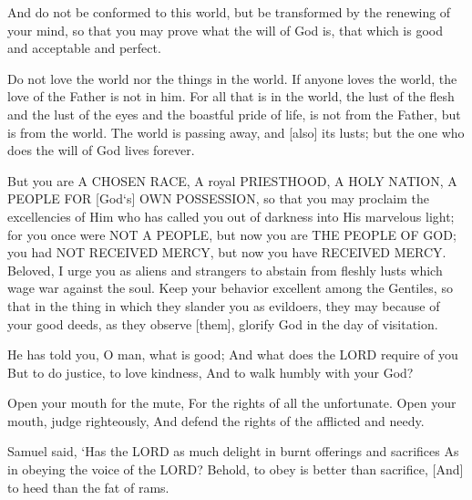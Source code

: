 \begin{scripture}[Romans 12:2]
    And do not be conformed to this world, but be transformed by the renewing of your mind, so that you may prove what the will of God is, that which is good and acceptable and perfect.
\end{scripture}

\begin{scripture}[1 John 2:15-17]
    Do not love the world nor the things in the world. If anyone loves the world, the love of the Father is not in him.
    For all that is in the world, the lust of the flesh and the lust of the eyes and the boastful pride of life, is not from the Father, but is from the world.
    The world is passing away, and [also] its lusts; but the one who does the will of God lives forever.
\end{scripture}

\begin{scripture}[1 Peter 2:9-12]
    But you are A CHOSEN RACE, A royal PRIESTHOOD, A HOLY NATION, A PEOPLE FOR [God`s] OWN POSSESSION, so that you may proclaim the excellencies of Him who has called you out of darkness into His marvelous light;
    for you once were NOT A PEOPLE, but now you are THE PEOPLE OF GOD; you had NOT RECEIVED MERCY, but now you have RECEIVED MERCY.
    Beloved, I urge you as aliens and strangers to abstain from fleshly lusts which wage war against the soul.
    Keep your behavior excellent among the Gentiles, so that in the thing in which they slander you as evildoers, they may because of your good deeds, as they observe [them], glorify God in the day of visitation.
\end{scripture}

\begin{scripture}[Micah 6:8]
    He has told you, O man, what is good; And what does the LORD require of you But to do justice, to love kindness, And to walk humbly with your God?
\end{scripture}

\begin{scripture}[Proverbs 31:8-9]
    Open your mouth for the mute, For the rights of all the unfortunate.
    Open your mouth, judge righteously, And defend the rights of the afflicted and needy.
\end{scripture}

\begin{scripture}[1 Samuel 15:22]
    Samuel said, `Has the LORD as much delight in burnt offerings and sacrifices As in obeying the voice of the LORD? Behold, to obey is better than sacrifice, [And] to heed than the fat of rams.
\end{scripture}

